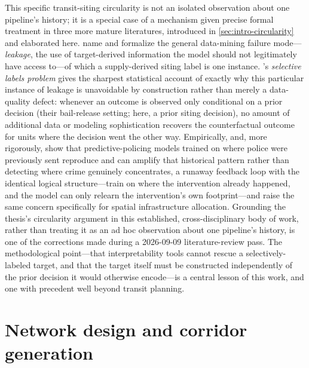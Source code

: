 This specific transit-siting circularity is not an isolated observation about one
pipeline's history; it is a special case of a mechanism given precise formal treatment in
three more mature literatures, introduced in \cref{sec:intro-circularity} and elaborated
here. \textcite{kaufman2012leakage} name and formalize the general data-mining failure
mode---\emph{leakage}, the use of target-derived information the model should not
legitimately have access to---of which a supply-derived siting label is one instance.
\textcite{lakkaraju2017selectivelabels}'s \emph{selective labels problem} gives the
sharpest statistical account of exactly why this particular instance of leakage is
unavoidable by construction rather than merely a data-quality defect: whenever an outcome
is observed only conditional on a prior decision (their bail-release setting; here, a
prior siting decision), no amount of additional data or modeling sophistication recovers
the counterfactual outcome for units where the decision went the other way. Empirically,
\textcite{lum2016predict} and, more rigorously, \textcite{ensign2018runaway} show that
predictive-policing models trained on where police were previously sent reproduce and can
amplify that historical pattern rather than detecting where crime genuinely concentrates,
a runaway feedback loop with the identical logical structure---train on where the
intervention already happened, and the model can only relearn the intervention's own
footprint---and \textcite{flynn2022spacetime} raise the same concern specifically for
spatial infrastructure allocation. Grounding the thesis's circularity argument in this
established, cross-disciplinary body of work, rather than treating it as an ad hoc
observation about one pipeline's history, is one of the corrections made during a
2026-09-09 literature-review pass. The methodological point---that interpretability tools
cannot rescue a selectively-labeled target, and that the target itself must be constructed
independently of the prior decision it would otherwise encode---is a central lesson of
this work, and one with precedent well beyond transit planning.

\section{Network design and corridor generation}
\label{sec:lit-network}

